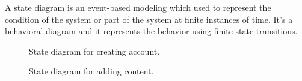 		  
A state diagram is an event-based modeling which used to represent the condition of the system or part of the system at finite instances of time. It's a behavioral diagram and it represents the behavior using finite state transitions.


\begin{figure}[H]
\begin{center}	

	\caption{State diagram for creating account.}
	\label{dia_stt_crtacnt}

\end{center}
\end{figure}

\begin{figure}[H]
\begin{center}	

	\caption{State diagram for adding content.}
	\label{dia_stt_addcntnt}

\end{center}
\end{figure}

